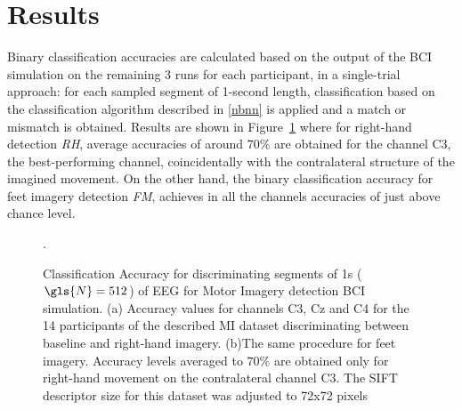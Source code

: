 \section{Results}

Binary classification accuracies are calculated based on the output of the BCI simulation on the remaining 3 runs for each participant, in a single-trial approach: for each sampled segment of 1-second length, classification based on the classification algorithm described in \ref{nbnn} is applied and a match or mismatch is obtained.  Results are shown in Figure~\ref{fig:miresults} where for right-hand detection \textit{RH}, average accuracies of around $70\%$ are obtained for the channel C3, the best-performing channel, coincidentally with the contralateral structure of the imagined movement.  On the other hand, the binary classification accuracy for feet imagery detection \textit{FM}, achieves in all the channels accuracies of just above chance level.

   
\begin{figure}[h!]
\centering
{}
\caption[Motor Imagery Accuracy]{Classification Accuracy for discriminating segments of 1s ($\gls{N} = 512$) of EEG for Motor Imagery detection BCI simulation. (a) Accuracy values for channels C3, Cz and C4 for the 14 participants of the described MI dataset discriminating between baseline and right-hand imagery. (b)The same procedure for feet imagery. Accuracy levels averaged to $70\%$ are obtained only for right-hand movement on the contralateral channel C3. The SIFT descriptor size for this dataset was adjusted to 72x72 pixels}.
\label{fig:miresults}
\end{figure}
   
